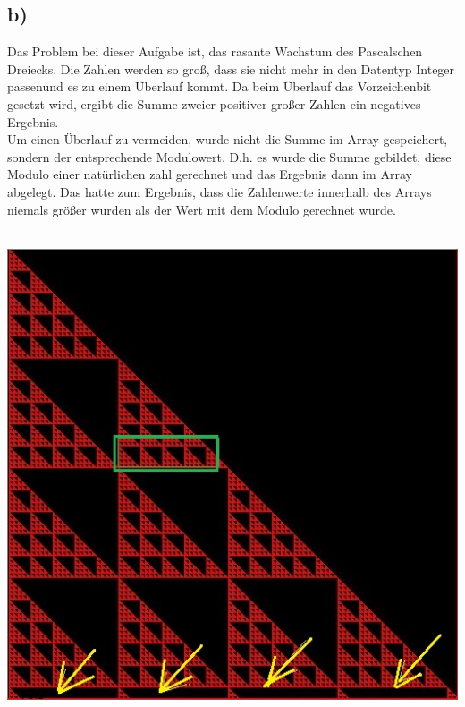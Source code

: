 \documentclass[10pt,a4paper]{article}
\begin{document}
\subsection*{b)}
Das Problem bei dieser Aufgabe ist, das rasante Wachstum des Pascalschen Dreiecks. Die Zahlen werden so groß, dass sie nicht mehr in den Datentyp Integer \glqq passen\grqq und es zu einem Überlauf kommt. Da beim Überlauf das Vorzeichenbit gesetzt wird, ergibt die Summe zweier positiver großer Zahlen ein negatives Ergebnis.\\
Um einen Überlauf zu vermeiden, wurde nicht die Summe im Array gespeichert, sondern der entsprechende Modulowert. D.h. es wurde die Summe gebildet, diese Modulo einer natürlichen zahl gerechnet und das Ergebnis dann im Array abgelegt. Das hatte zum Ergebnis, dass die Zahlenwerte innerhalb des Arrays niemals größer wurden als der Wert mit dem Modulo gerechnet wurde.\\
\ \\
\begin{center}
	\includegraphics[scale=0.5]{Screens/Prim}
	\label{fig:prim}
\end{center}
\ \\
\end{document}
